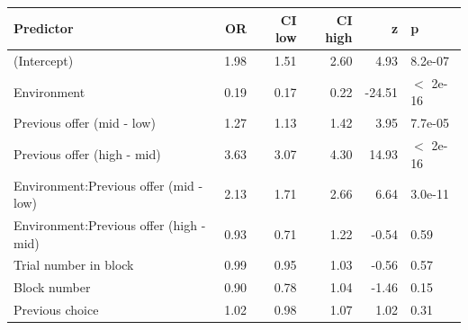 \begin{table}[ht]
\centering
\begin{tabular}{lrrrrl}
  \hline
Predictor & OR & CI low & CI high & z & p \\ 
  \hline
(Intercept) & 1.98 & 1.51 & 2.60 & 4.93 & 8.2e-07 \\ 
  Environment & 0.19 & 0.17 & 0.22 & -24.51 & $<$ 2e-16 \\ 
  Previous offer (mid - low) & 1.27 & 1.13 & 1.42 & 3.95 & 7.7e-05 \\ 
  Previous offer (high - mid) & 3.63 & 3.07 & 4.30 & 14.93 & $<$ 2e-16 \\ 
  Environment:Previous offer (mid - low) & 2.13 & 1.71 & 2.66 & 6.64 & 3.0e-11 \\ 
  Environment:Previous offer (high - mid) & 0.93 & 0.71 & 1.22 & -0.54 & 0.59 \\ 
  Trial number in block & 0.99 & 0.95 & 1.03 & -0.56 & 0.57 \\ 
  Block number & 0.90 & 0.78 & 1.04 & -1.46 & 0.15 \\ 
  Previous choice & 1.02 & 0.98 & 1.07 & 1.02 & 0.31 \\ 
   \hline
\end{tabular}
\end{table}
